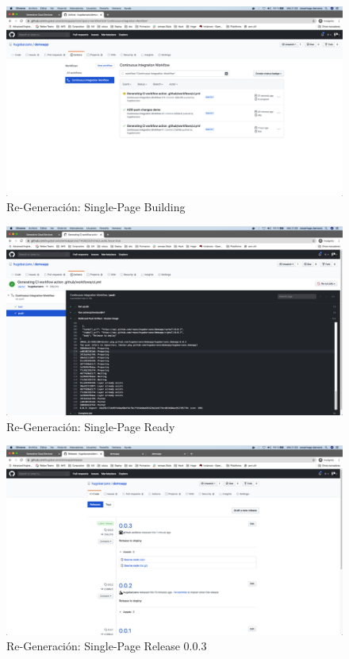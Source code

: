 \documentclass[a4paper,11pt]{book}
\begin{document}
   \begin{figure}[H]
\centering
\includegraphics[scale=0.2]{imagenes/casouso/4_4.png}
\caption{  Re-Generación: Single-Page Building }
\end{figure}


   \begin{figure}[H]
\centering
\includegraphics[scale=0.2]{imagenes/casouso/4_5.png}
\caption{  Re-Generación: Single-Page Ready }
\end{figure}


   \begin{figure}[H]
\centering
\includegraphics[scale=0.2]{imagenes/casouso/4_6.png}
\caption{  Re-Generación: Single-Page Release 0.0.3 }
\end{figure}
\end{document}
